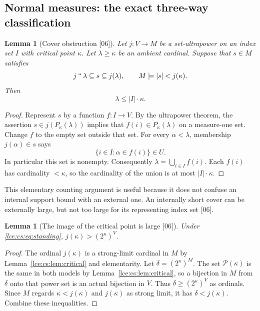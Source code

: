 \documentclass[11pt,letterpaper]{article}
\numberwithin{equation}{section}
\newtheorem{lemma}[theorem]{Lemma}
\theoremstyle{definition}
\theoremstyle{remark}
\newcommand{\Pow}{\mathcal P}
\newcommand{\imset}[2]{#1\mathbin{``}#2}
\newcommand{\abs}[1]{\lvert#1\rvert}
\newcommand{\leref}[1]{Lemma~\ref{#1}}
\newcommand{\src}[1]{\textup{\textsf{\small[#1]}}}%
\begin{document}
\subsection{Normal measures: the exact three-way classification}

\begin{lemma}[Cover obstruction \src{06}]\label{lce:cs:lem:cover-obstruction}
Let $j:V\to M$ be a set-ultrapower on an index set $I$ with critical point
$\kappa$. Let $\lambda\ge\kappa$ be an ambient cardinal. Suppose that
$s\in M$ satisfies
\[
 \imset j\lambda\subseteq s\subseteq j(\lambda),
 \qquad M\models\abs s<j(\kappa).
\]
Then
\begin{equation}\label{lce:cs:eq:index-obstruction}
 \lambda\le\abs I\cdot\kappa.
\end{equation}
\end{lemma}
\begin{proof}
Represent $s$ by a function $f:I\to V$. By the ultrapower theorem, the
assertion $s\in j(P_\kappa(\lambda))$ implies that $f(i)\in P_\kappa(\lambda)$
on a measure-one set. Change $f$ to the empty set outside that set. For every
$\alpha<\lambda$, membership $j(\alpha)\in s$ says
\[
 \{i\in I:\alpha\in f(i)\}\in U.
\]
In particular this set is nonempty. Consequently
$\lambda=\bigcup_{i\in I}f(i)$. Each $f(i)$ has cardinality $<\kappa$, so the
cardinality of the union is at most $\abs I\cdot\kappa$.
\end{proof}
This elementary counting argument is useful because it does not confuse an
internal support bound with an external one. An internally short cover can
be externally large, but not too large for its representing index set
\src{06}.

\begin{lemma}[The image of the critical point is large \src{06}]\label{lce:cs:lem:j-kappa-large}
Under \eqref{lce:cs:eq:standing}, $j(\kappa)>(2^\kappa)^V$.
\end{lemma}
\begin{proof}
The ordinal $j(\kappa)$ is a strong-limit cardinal in $M$ by
\leref{lce:cs:lem:critical} and elementarity. Let $\delta=(2^\kappa)^M$. The
set $\Pow(\kappa)$ is the same in both models by
\leref{lce:cs:lem:critical}, so a bijection in $M$ from $\delta$ onto that
power set is an actual bijection in $V$. Thus $\delta\ge(2^\kappa)^V$ as ordinals.
Since $M$ regards $\kappa<j(\kappa)$ and $j(\kappa)$ as strong limit, it has
$\delta<j(\kappa)$. Combine these inequalities.
\end{proof}
\end{document}
